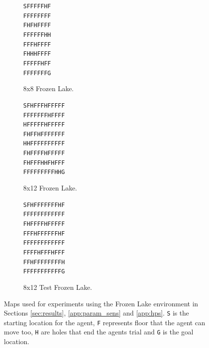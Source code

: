         \begin{figure}
             \centering
             \begin{subfigure}[b]{0.3\textwidth}
                 \centering
                 \texttt{SFFFFFHF} \\
                 \texttt{FFFFFFFF} \\
                 \texttt{FHFHFFFF} \\
                 \texttt{FFFFFFHH} \\
                 \texttt{FFFHFFFF} \\
                 \texttt{FHHHFFFF} \\
                 \texttt{FFFFFHFF} \\
                 \texttt{FFFFFFFG} 
                 \caption{8x8 Frozen Lake.}
                 \label{fig:fl8}
             \end{subfigure}
             \hfill
             \begin{subfigure}[b]{0.3\textwidth}
                 \centering
                 \texttt{SFHFFFHFFFFF} \\
                 \texttt{FFFFFFFHFFFF} \\
                 \texttt{HFFFFFHFFFFF} \\
                 \texttt{FHFFHFFFFFFF} \\
                 \texttt{HHFFFFFFFFFF} \\
                 \texttt{FHFFFFHFFFFF} \\
                 \texttt{FHFFFHHFHFFF} \\
                 \texttt{FFFFFFFFFHHG} 
                 \caption{8x12 Frozen Lake.}
                 \label{fig:fl12}
             \end{subfigure}
             \hfill
             \begin{subfigure}[b]{0.3\textwidth}
                 \centering
                 \texttt{SFHFFFFFFFHF} \\
                 \texttt{FFFFFFFFFFFF} \\
                 \texttt{FHFFFFHFFFFF} \\
                 \texttt{FFFHFFFFFFHF} \\
                 \texttt{FFFFFFFFFFFF} \\
                 \texttt{FFFFHFFFHFFF} \\
                 \texttt{FFHFFFFFFFFH} \\
                 \texttt{FFFFFFFFFFFG} 
                 \caption{8x12 Test Frozen Lake.}
                 \label{fig:fl12test}
            \end{subfigure}
            \caption{Maps used for experiments using the Frozen Lake environment in Sections \ref{sec:results}, \ref{app:param_sens} and \ref{app:hps}. \texttt{S} is the starting location for the agent, \texttt{F} represents floor that the agent can move too, \texttt{H} are holes that end the agents trial and \texttt{G} is the goal location.}
                \label{fig:maps}
        \end{figure}
    
